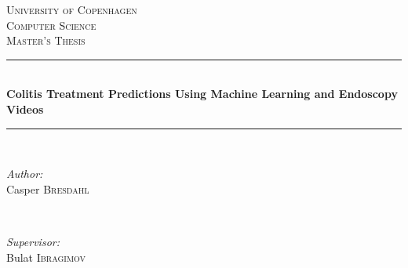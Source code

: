 \documentclass{article}                                                        %
\begin{document}
\begin{titlepage}

\newcommand{\HRule}{\rule{\linewidth}{0.5mm}} %

\begin{center}
 

\textsc{\LARGE University of Copenhagen}\\[1.5cm] %
\textsc{\Large Computer Science}\\[0.5cm] %
\textsc{\large Master's Thesis}\\[0.5cm] %


\HRule \\[0.4cm]
{ \huge \bfseries Colitis Treatment Predictions Using Machine Learning and Endoscopy Videos}\\[0.4cm] %
\HRule \\[1.5cm]
 

\begin{minipage}{0.4\textwidth}
\begin{flushleft} \large
\emph{Author:}\\ 
Casper \textsc{Bresdahl} \\
\end{flushleft}
\end{minipage}
~
\begin{minipage}{0.4\textwidth}
\begin{flushright} \large
\emph{Supervisor:} \\
Bulat \textsc{Ibragimov}
\end{flushright}
\end{minipage}\\[2cm]


\end{center}
\end{titlepage}
\end{document}
